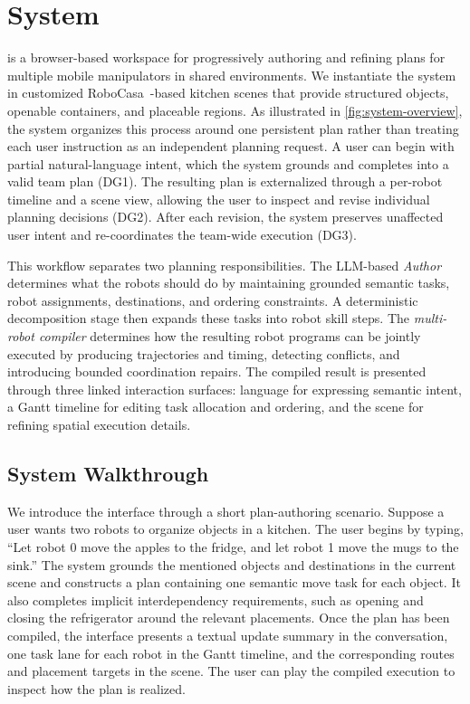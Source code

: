 \section{\oursystem{} System}
\label{sec:system}

\oursystem{} is a browser-based workspace for progressively authoring and refining plans for multiple mobile manipulators in shared environments.
We instantiate the system in customized RoboCasa~\cite{nasiriany2024robocasa, nasiriany2026robocasa365}-based kitchen scenes that provide structured objects, openable containers, and placeable regions.
As illustrated in \autoref{fig:system-overview}, the system organizes this process around one persistent plan rather than treating each user instruction as an independent planning request.
A user can begin with partial natural-language intent, which the system grounds and completes into a valid team plan (DG1).
The resulting plan is externalized through a per-robot timeline and a scene view, allowing the user to inspect and revise individual planning decisions (DG2).
After each revision, the system preserves unaffected user intent and re-coordinates the team-wide execution (DG3).

This workflow separates two planning responsibilities.
The LLM-based \emph{Author} determines what the robots should do by maintaining grounded semantic tasks, robot assignments, destinations, and ordering constraints.
A deterministic decomposition stage then expands these tasks into robot skill steps.
The \emph{multi-robot compiler} determines how the resulting robot programs can be jointly executed by producing trajectories and timing, detecting conflicts, and introducing bounded coordination repairs.
The compiled result is presented through three linked interaction surfaces: language for expressing semantic intent, a Gantt timeline for editing task allocation and ordering, and the scene for refining spatial execution details.

\subsection{System Walkthrough}
\label{sec:system-walkthrough}

We introduce the interface through a short plan-authoring scenario.
Suppose a user wants two robots to organize objects in a kitchen.
The user begins by typing, ``Let robot 0 move the apples to the fridge, and let robot 1 move the mugs to the sink.''
The system grounds the mentioned objects and destinations in the current scene and constructs a plan containing one semantic move task for each object.
It also completes implicit interdependency requirements, such as opening and closing the refrigerator around the relevant placements.
Once the plan has been compiled, the interface presents a textual update summary in the conversation, one task lane for each robot in the Gantt timeline, and the corresponding routes and placement targets in the scene.
The user can play the compiled execution to inspect how the plan is realized.

